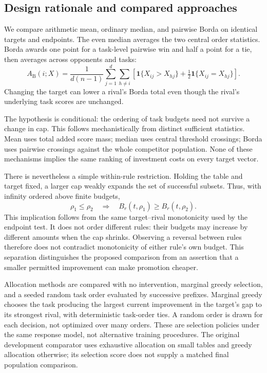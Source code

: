 \documentclass{article}
\newcommand{\budget}{B}
\begin{document}
\subsection{Design rationale and compared approaches}
We compare arithmetic mean, ordinary median, and pairwise Borda on identical targets and endpoints. The even median averages the two central order statistics. Borda awards one point for a task-level pairwise win and half a point for a tie, then averages across opponents and tasks:
\begin{equation}
 A_{\mathrm{B}}(i;X)=\frac{1}{d(n-1)}\sum_{j=1}^{d}\sum_{h\ne i}
 \left[\mathbf{1}\{X_{ij}>X_{hj}\}+\tfrac12\mathbf{1}\{X_{ij}=X_{hj}\}\right].
 \label{eq:borda}
\end{equation}
Changing the target can lower a rival's Borda total even though the rival's underlying task scores are unchanged.

The hypothesis is conditional: the ordering of task budgets need not survive a change in cap. This follows mechanistically from distinct sufficient statistics. Mean uses total added score mass; median uses central threshold crossings; Borda uses pairwise crossings against the whole competitor population. None of these mechanisms implies the same ranking of investment costs on every target vector.

There is nevertheless a simple within-rule restriction. Holding the table and target fixed, a larger cap weakly expands the set of successful subsets. Thus, with infinity ordered above finite budgets,
\begin{equation}
 \rho_1\leq\rho_2\quad\Longrightarrow\quad
 \budget_r(t,\rho_1)\geq\budget_r(t,\rho_2).
 \label{eq:monotone}
\end{equation}
This implication follows from the same target--rival monotonicity used by the endpoint test. It does not order different rules: their budgets may increase by different amounts when the cap shrinks. Observing a reversal between rules therefore does not contradict monotonicity of either rule's own budget. This separation distinguishes the proposed comparison from an assertion that a smaller permitted improvement can make promotion cheaper.

Allocation methods are compared with no intervention, marginal greedy selection, and a seeded random task order evaluated by successive prefixes. Marginal greedy chooses the task producing the largest current improvement in the target's gap to its strongest rival, with deterministic task-order ties. A random order is drawn for each decision, not optimized over many orders. These are selection policies under the same response model, not alternative training procedures. The original development comparator uses exhaustive allocation on small tables and greedy allocation otherwise; its selection score does not supply a matched final population comparison.
\end{document}
